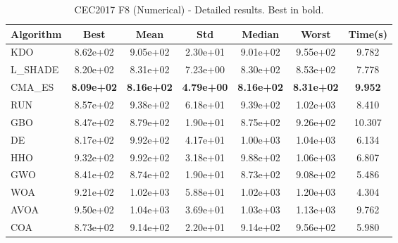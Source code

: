 \begin{table}[H]
\centering\small
\caption{CEC2017 F8 (Numerical) - Detailed results. Best in bold.}
\label{tab:cec2017_F8}
\begin{tabular}{lcccccc}
\toprule
\textbf{Algorithm} & \textbf{Best} & \textbf{Mean} & \textbf{Std} & \textbf{Median} & \textbf{Worst} & \textbf{Time(s)} \\
\midrule
KDO & 8.62e+02 & 9.05e+02 & 2.30e+01 & 9.01e+02 & 9.55e+02 & 9.782 \\
L_SHADE & 8.20e+02 & 8.31e+02 & 7.23e+00 & 8.30e+02 & 8.53e+02 & 7.778 \\
CMA_ES & \textbf{8.09e+02} & \textbf{8.16e+02} & \textbf{4.79e+00} & \textbf{8.16e+02} & \textbf{8.31e+02} & \textbf{9.952} \\
RUN & 8.57e+02 & 9.38e+02 & 6.18e+01 & 9.39e+02 & 1.02e+03 & 8.410 \\
GBO & 8.47e+02 & 8.79e+02 & 1.90e+01 & 8.75e+02 & 9.26e+02 & 10.307 \\
DE & 8.17e+02 & 9.92e+02 & 4.17e+01 & 1.00e+03 & 1.04e+03 & 6.134 \\
HHO & 9.32e+02 & 9.92e+02 & 3.18e+01 & 9.88e+02 & 1.06e+03 & 6.807 \\
GWO & 8.41e+02 & 8.74e+02 & 1.90e+01 & 8.73e+02 & 9.08e+02 & 5.486 \\
WOA & 9.21e+02 & 1.02e+03 & 5.88e+01 & 1.02e+03 & 1.20e+03 & 4.304 \\
AVOA & 9.50e+02 & 1.04e+03 & 3.69e+01 & 1.03e+03 & 1.13e+03 & 9.762 \\
COA & 8.73e+02 & 9.14e+02 & 2.20e+01 & 9.14e+02 & 9.56e+02 & 5.980 \\
\bottomrule
\end{tabular}
\end{table}

